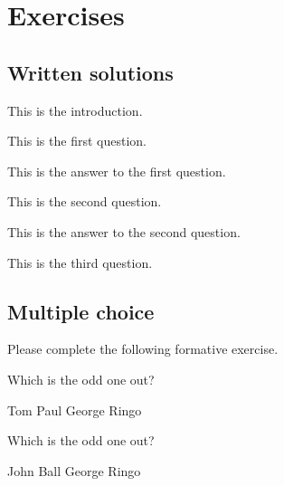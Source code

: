 \documentclass{../../../texmf/camel}
\begin{document}
\chapter{Exercises}\label{ch:exercises}

\section{Written solutions}\label{se:written-solutions}

\begin{diagnostic}\label{diag:demo}
This is the introduction.
\begin{questions} 
\question This is the first question.\label{qu:first-question}
\begin{answer} 
This is the answer to the first question.
\end{answer} 
\question This is the second question.\label{qu:second-question}
\begin{answer} 
This is the answer to the second question.
\end{answer} 
\question This is the third question.\label{qu:third-question}
\end{questions} 
\end{diagnostic}

\section{Multiple choice}

\begin{formative}\label{di:beatles} 
Please complete the following formative exercise.
\begin{questions} 
\question Which is the odd one out?  
\begin{choices} 
\correctchoice Tom
\choice Paul 
\choice George 
\choice Ringo 
\end{choices} 
\question Which is the odd one out?  
\begin{choices} 
\choice John 
\correctchoice Ball 
\choice George 
\choice Ringo 
\end{choices} 
\end{questions}
\end{formative}
\end{document}
